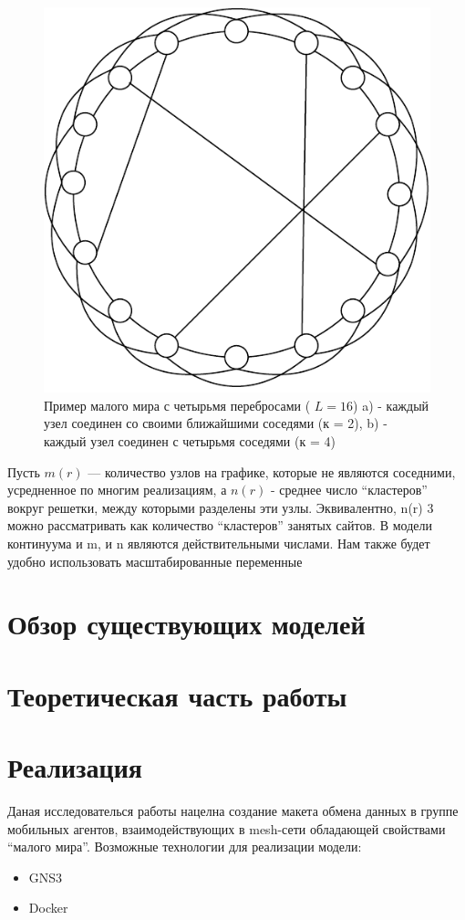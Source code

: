 \documentclass[a4paper]{article}
\begin{document}
\begin{figure}[H]
\begin{center}
\begin{minipage}[h]{0.4\linewidth}
	\includegraphics[width=1\linewidth]{3neighbours.pdf}
	\end{minipage}
        \caption{Пример малого мира с четырьмя перебросами ( $L = 16$) a) - каждый узел соединен со своими ближайшими соседями (к = 2), b) - каждый узел соединен с четырьмя соседями (к = 4)}
    \end{center}
    \label{p2}
\end{figure}

Пусть $m (r)$ — количество узлов на графике, которые не являются соседними, усредненное по многим реализациям, а $n (r)$ - среднее число “кластеров” вокруг решетки, между которыми разделены эти узлы. Эквивалентно, n(r)
3
можно рассматривать как количество “кластеров” занятых сайтов. В модели континуума и m, и n являются действительными числами. Нам также будет удобно использовать масштабированные переменные
\section{Обзор существующих моделей}
\section{Теоретическая часть работы}

\section[]{Реализация}
Даная исследователься работы нацелна создание макета обмена данных в группе мобильных агентов, взаимодействующих в mesh-сети обладающей свойствами “малого мира”.
Возможные технологии для реализации модели:
\begin{itemize}
    \item GNS3
    \item Docker
\end{itemize}
\end{document}
